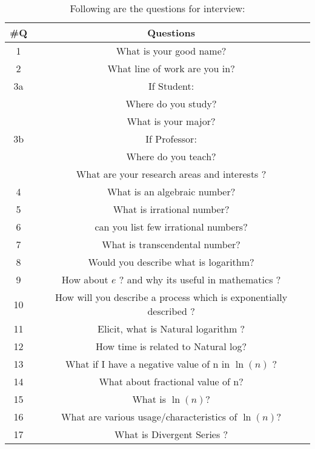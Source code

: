 \documentclass{article}
\begin{document}
\begin{table}[ht!]
        \caption{Following are the questions for interview:}
        \label{tab:table1}
        
        \begin{tabular}{|| c | c ||}
        \toprule
        \textbf{\#Q} & \textbf{Questions}  \\
        \hline
        1 & What is your good name? \\
        \hline
         2 & What line of work are you in? \\
         \hline
         3a & If Student: \\
         & Where do you study? \\
         & What is your major? \\
         \hline
         3b & If Professor: \\
         & Where do you teach? \\
         & What are your research areas and interests ? \\
         \hline
         4 & What is an algebraic number? \\
         \hline
         5 & What is irrational number? \\
         \hline
         6 & can you list few irrational numbers? \\
         \hline
         7 & What is transcendental number? \\
         \hline
         8 & Would you describe what is logarithm? \\
         \hline
         9 & How about $e$ ? and why its useful in mathematics ? \\
         \hline
         10 & How will you describe a process which is exponentially described ? \\
         \hline
         11 & Elicit, what is Natural logarithm ? \\
         \hline
         12 & How time is related to Natural log? \\
         \hline
         13 & What if I have a negative value of n in $\ln(n)$ ? \\
         \hline
         14 & What about fractional value of n? \\
         \hline
         15 & What is $\ln(n)$? \\
         \hline
         16 & What are various usage/characteristics of $\ln(n)$? \\
         \hline
         17 & What is Divergent Series ? \\

\end{tabular}
\end{table}
\end{document}

